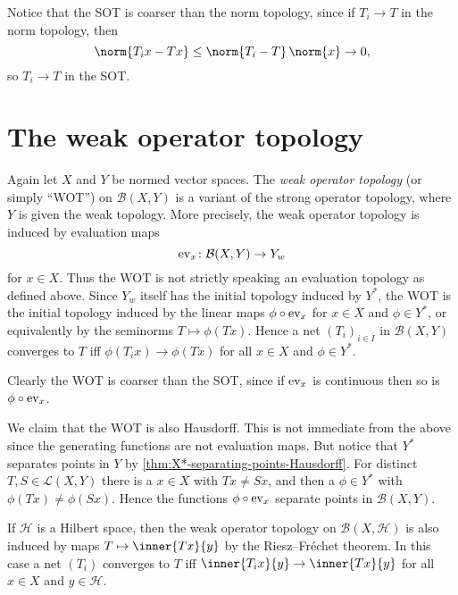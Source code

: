\documentclass[article, a4paper, 11pt, oneside]{memoir}
\numberwithin{equation}{chapter}
\newcommand{\calB}{\mathcal{B}}
\newcommand{\calL}{\mathcal{L}}
\newcommand{\calH}{\mathcal{H}}
\begin{document}
Notice that the SOT is coarser than the norm topology, since if $T_i \to T$ in the norm topology, then
%
\begin{equation*}
    \norm{T_i x - Tx}
        \leq \norm{T_i - T} \, \norm{x}
        \to 0,
\end{equation*}
%
so $T_i \to T$ in the SOT.


\section{The weak operator topology}

Again let $X$ and $Y$ be normed vector spaces. The \emph{weak operator topology} (or simply \enquote{WOT}) on $\calB(X,Y)$ is a variant of the strong operator topology, where $Y$ is given the weak topology. More precisely, the weak operator topology is induced by evaluation maps
%
\begin{equation*}
    \ev_x \colon \calB(X,Y) \to Y_w
\end{equation*}
%
for $x \in X$. Thus the WOT is not strictly speaking an evaluation topology as defined above. Since $Y_w$ itself has the initial topology induced by $Y^*$, the WOT is the initial topology induced by the linear maps $\phi \circ \mathrm{ev}_x$ for $x \in X$ and $\phi \in Y^*$, or equivalently by the seminorms $T \mapsto \phi(Tx)$. Hence a net $(T_i)_{i \in I}$ in $\calB(X,Y)$ converges to $T$ iff $\phi(T_i x) \to \phi(Tx)$ for all $x \in X$ and $\phi \in Y^*$.

Clearly the WOT is coarser than the SOT, since if $\mathrm{ev}_x$ is continuous then so is $\phi \circ \mathrm{ev}_x$.

We claim that the WOT is also Hausdorff. This is not immediate from the above since the generating functions are not evaluation maps. But notice that $Y^*$ separates points in $Y$ by \cref{thm:X*-separating-points-Hausdorff}. For distinct $T,S \in \calL(X,Y)$ there is a $x \in X$ with $Tx \neq Sx$, and then a $\phi \in Y^*$ with $\phi(Tx) \neq \phi(Sx)$. Hence the functions $\phi \circ \mathrm{ev}_x$ separate points in $\calB(X,Y)$.

If $\calH$ is a Hilbert space, then the weak operator topology on $\calB(X,\calH)$ is also induced by maps $T \mapsto \inner{Tx}{y}$ by the Riesz--Fréchet theorem. In this case a net $(T_i)$ converges to $T$ iff $\inner{T_i x}{y} \to \inner{Tx}{y}$ for all $x \in X$ and $y \in \calH$.


\nocite{*}

\printbibliography
\end{document}
